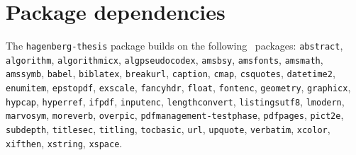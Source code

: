 \documentclass[english]{hgbarticle}
\begin{document}
\section{Package dependencies}

\begin{sloppypar}
The \texttt{hagenberg-thesis} package builds on the following \latex\
packages:\newline
\texttt{abstract}, 
\texttt{algorithm}, 
\texttt{algorithmicx}, 
\texttt{algpseudocodex}, 
\texttt{amsbsy}, 
\texttt{amsfonts}, 
\texttt{amsmath}, 
\texttt{amssymb}, 
\texttt{babel}, 
\texttt{biblatex}, 
\texttt{breakurl}, 
\texttt{caption}, 
\texttt{cmap}, 
\texttt{csquotes}, 
\texttt{datetime2}, 
\texttt{enumitem}, 
\texttt{epstopdf}, 
\texttt{exscale}, 
\texttt{fancyhdr}, 
\texttt{float}, 
\texttt{fontenc}, 
\texttt{geometry}, 
\texttt{graphicx}, 
\texttt{hypcap}, 
\texttt{hyperref}, 
\texttt{ifpdf}, 
\texttt{inputenc}, 
\texttt{lengthconvert},
\texttt{listingsutf8}, 
\texttt{lmodern},
\texttt{marvosym}, 
\texttt{moreverb}, 
\texttt{overpic}, 
\texttt{pdfmanagement-testphase}, 
\texttt{pdfpages}, 
\texttt{pict2e}, 
\texttt{subdepth}, 
\texttt{titlesec}, 
\texttt{titling},
\texttt{tocbasic},
\texttt{url}, 
\texttt{upquote}, 
\texttt{verbatim}, 
\texttt{xcolor}, 
\texttt{xifthen},
\texttt{xstring},
\texttt{xspace}.
\end{sloppypar}
\end{document}
